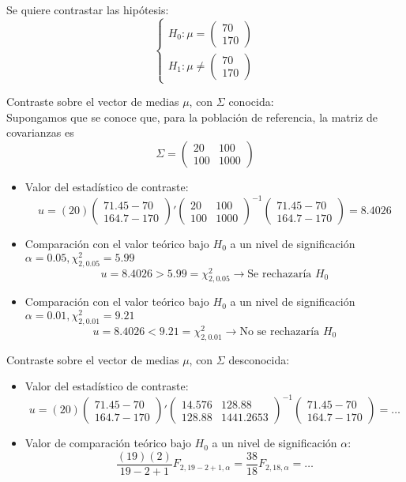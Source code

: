 \documentclass[11pt,a4paper]{article}
\begin{document}
Se quiere contrastar las hipótesis:
$$\begin{cases}
H_{0}: \mu = \begin{pmatrix} 70 \\ 170 \end{pmatrix} \\
H_{1}: \mu \neq \begin{pmatrix} 70 \\ 170 \end{pmatrix}
\end{cases}$$

Contraste sobre el vector de medias $\mu$, con $\Sigma$ conocida: \\
Supongamos que se conoce que, para la población de referencia, la matriz de covarianzas es
$$\Sigma = \begin{pmatrix}
20 & 100 \\
100 & 1000
\end{pmatrix}$$
\begin{itemize}
\item Valor del estadístico de contraste:
$$u = (20) \begin{pmatrix}
71.45 - 70 \\
164.7 - 170
\end{pmatrix}' \begin{pmatrix}
20 & 100 \\
100 & 1000
\end{pmatrix}^{-1} \begin{pmatrix}
71.45 - 70 \\
164.7 - 170
\end{pmatrix} = 8.4026$$
\item Comparación con el valor teórico bajo $H_{0}$ a un nivel de significación $\alpha = 0.05, \chi^{2}_{2, 0.05} = 5.99$
$$u = 8.4026 > 5.99 = \chi^{2}_{2, 0.05} \to \text{Se rechazaría } H_{0}$$
\item Comparación con el valor teórico bajo $H_{0}$ a un nivel de significación $\alpha = 0.01, \chi^{2}_{2, 0.01} = 9.21$
$$u = 8.4026 < 9.21 = \chi^{2}_{2, 0.01} \to \text{No se rechazaría } H_{0}$$
\end{itemize}

Contraste sobre el vector de medias $\mu$, con $\Sigma$ desconocida:
\begin{itemize}
\item Valor del estadístico de contraste:
$$u = (20) \begin{pmatrix}
71.45 - 70 \\
164.7 - 170
\end{pmatrix}' \begin{pmatrix}
14.576 & 128.88 \\
128.88 & 1441.2653
\end{pmatrix}^{-1} \begin{pmatrix}
71.45 - 70 \\
164.7 - 170
\end{pmatrix} = \dots$$
\item Valor de comparación teórico bajo $H_{0}$ a un nivel de significación $\alpha$:
$$\frac{(19)(2)}{19-2+1}F_{2, 19-2+1, \alpha} = \frac{38}{18}F_{2, 18, \alpha} = \dots$$
\end{itemize}
\end{document}
